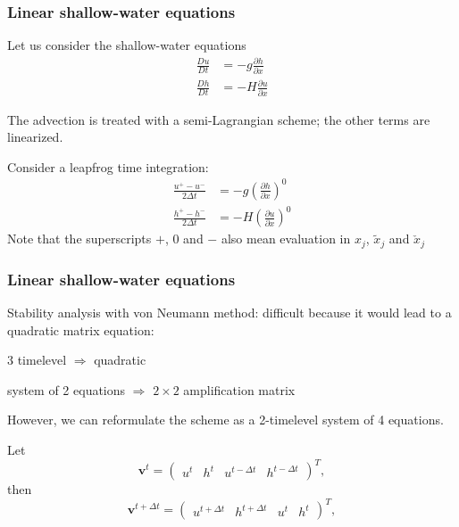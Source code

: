 \documentclass[aspectratio=43,9pt]{beamer}
\begin{document}
%
\begin{frame}
	\frametitle{Linear shallow-water equations}
	\begin{myitemize}{2ex}
		\item Let us consider the shallow-water equations
			\begin{align*}
				\frac{D u}{D t} &= -g \frac{\partial h}{\partial x} \\
				\frac{D h}{D t} &= - H \frac{\partial u}{\partial x}
			\end{align*}
		\item The advection is treated with a semi-Lagrangian scheme; the other terms are linearized.
		\item Consider a leapfrog time integration:
			\begin{align*}
				\frac{u^+ - u^-}{2 \Delta t} &= -g \left(
				\frac{\partial h}{\partial x}
				\right)^0
				\\
				\frac{h^+-h^-}{2 \Delta t} &= - H
				\left(
				\frac{\partial u}{\partial x}
				\right)^0 
			\end{align*}
			Note that the superscripts $+$, $0$ and $-$ also mean evaluation in $x_j$, $\tilde x_j$ and $\check x_j$
	\end{myitemize}
\end{frame}
%
%
\begin{frame}
	\frametitle{Linear shallow-water equations}
	\begin{myitemize}{2ex}
		\item Stability analysis with von Neumann method: difficult because it would lead to a quadratic matrix equation:
			\begin{myitemize}{1ex}
				\item 3 timelevel $\Rightarrow$ quadratic
				\item system of 2 equations $\Rightarrow$ $2\times 2$ amplification matrix
			\end{myitemize}
		\item However, we can reformulate the scheme as a 2-timelevel system of 4 equations.
			\par\vspace*{2ex}
			Let
			\begin{equation*}
				\bm v^t=\left(\begin{array}{cccc}u^t & h^t & u^{t-\Delta t} & h^{t-\Delta t}\end{array}\right)^T,
			\end{equation*}
			then
			\begin{equation*}
				\bm v^{t+\Delta t}=\left(\begin{array}{cccc}u^{t+\Delta t} & h^{t +\Delta t} & u^{t} & h^{t}\end{array}\right)^T,
			\end{equation*}
	\end{myitemize}
\end{frame}
\end{document}
